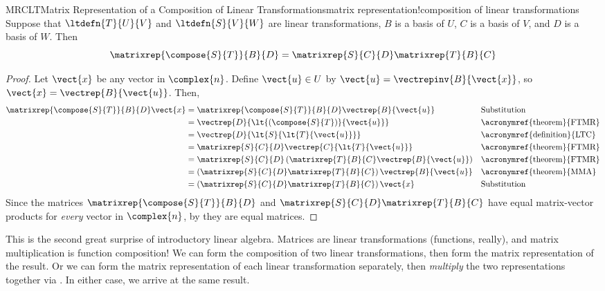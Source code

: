 %
\begin{theorem}{MRCLT}{Matrix Representation of a Composition of Linear Transformations}{matrix representation!composition of linear transformations}
Suppose that $\ltdefn{T}{U}{V}$ and $\ltdefn{S}{V}{W}$ are linear transformations, $B$ is a basis of $U$, $C$ is a basis of $V$, and $D$ is a basis of $W$.  Then
%
\begin{equation*}
\matrixrep{\compose{S}{T}}{B}{D}=\matrixrep{S}{C}{D}\matrixrep{T}{B}{C}
\end{equation*}
%
\end{theorem}
%
\begin{proof}
Let $\vect{x}$ be any vector in $\complex{n}$.  Define $\vect{u}\in U$ by $\vect{u}=\vectrepinv{B}{\vect{x}}$, so $\vect{x}=\vectrep{B}{\vect{u}}$.  Then,
%
\begin{align*}
\matrixrep{\compose{S}{T}}{B}{D}\vect{x}&=
\matrixrep{\compose{S}{T}}{B}{D}\vectrep{B}{\vect{u}}&&\text{Substitution}\\
&=\vectrep{D}{\lt{\left(\compose{S}{T}\right)}{\vect{u}}}&&\text{\acronymref{theorem}{FTMR}}\\
&=\vectrep{D}{\lt{S}{\lt{T}{\vect{u}}}}&&\text{\acronymref{definition}{LTC}}\\
&=\matrixrep{S}{C}{D}\vectrep{C}{\lt{T}{\vect{u}}}&&\text{\acronymref{theorem}{FTMR}}\\
&=\matrixrep{S}{C}{D}\left(\matrixrep{T}{B}{C}\vectrep{B}{\vect{u}}\right)&&\text{\acronymref{theorem}{FTMR}}\\
&=\left(\matrixrep{S}{C}{D}\matrixrep{T}{B}{C}\right)\vectrep{B}{\vect{u}}&&\text{\acronymref{theorem}{MMA}}\\
&=\left(\matrixrep{S}{C}{D}\matrixrep{T}{B}{C}\right)\vect{x}&&\text{Substitution}
\end{align*}
%
Since the matrices $\matrixrep{\compose{S}{T}}{B}{D}$ and $\matrixrep{S}{C}{D}\matrixrep{T}{B}{C}$ have equal matrix-vector products for {\em every} vector in $\complex{n}$, by  they are equal matrices.
%
\end{proof}
%
This is the second great surprise of introductory linear algebra.  Matrices are linear transformations (functions, really), and matrix multiplication is function composition!  We can form the composition of two linear transformations, then form the matrix representation of the result.  Or we can form the matrix representation of each linear transformation separately, then {\em multiply} the two representations together via .  In either case, we arrive at the same result.\par
